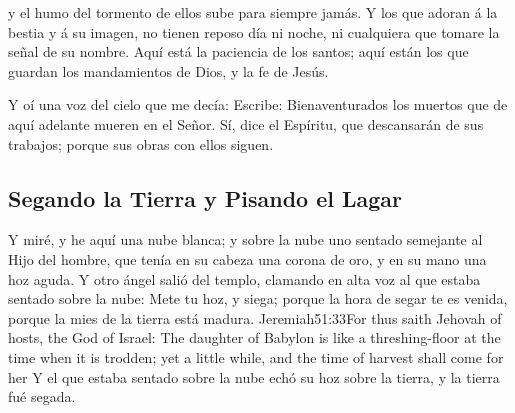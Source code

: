 y el humo del tormento de ellos sube para siempre jamás.%
 Y los que adoran á la bestia y á su imagen, no tienen reposo día ni noche,%
 ni cualquiera que tomare la señal de su nombre. 
Aquí está la paciencia de los santos; aquí están los que guardan los mandamientos de Dios, y la fe de Jesús.

Y oí una voz del cielo que me decía: Escribe: Bienaventurados los muertos que de aquí adelante mueren en el Señor. Sí, dice el Espíritu, que descansarán de sus trabajos; porque sus obras con ellos siguen.
\subsection*{Segando la Tierra y Pisando el Lagar}
Y miré, y he aquí una nube blanca; y sobre la nube uno sentado semejante al Hijo del hombre,%
 que tenía en su cabeza una corona de oro, y en su mano una hoz aguda. 
Y otro ángel salió del templo, clamando en alta voz al que estaba sentado sobre la nube: Mete tu hoz, y siega; porque la hora de segar te es venida, porque la mies de la tierra está madura.%
				  {Jeremiah}{51:33}{For thus saith Jehovah of hosts, the God of Israel: The daughter of Babylon is like a threshing-floor at the time when it is trodden; yet a little while, and the time of harvest shall come for her}
Y el que estaba sentado sobre la nube echó su hoz sobre la tierra, y la tierra fué segada.

